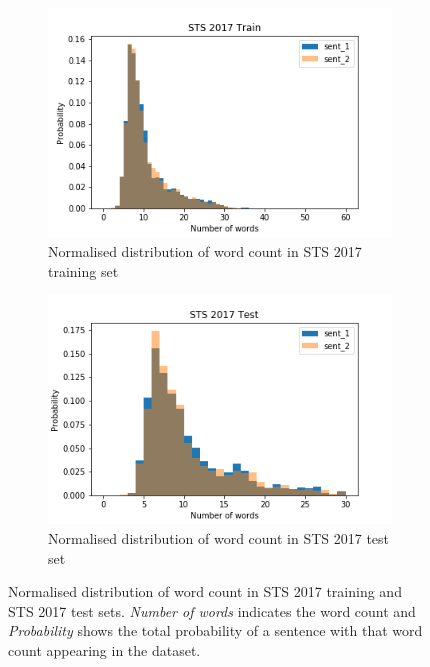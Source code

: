 \begin{enumerate}
\begin{figure}
	\captionsetup[subfigure]{justification=centering}
	\centering
	\begin{subfigure}[b]{.5\textwidth}
		\centering
		\includegraphics[width=\textwidth]{figures/semantic_textual_similarity/introduction/sts_2017_train_words.png}
		\caption{Normalised distribution of word count in STS 2017 training set}
		\label{fig:sts_train_words}
	\end{subfigure}%
	\begin{subfigure}[b]{.5\textwidth}
		\centering
		\includegraphics[width=\textwidth]{figures/semantic_textual_similarity/introduction/sts_2017_test_words.png}
		\caption{Normalised distribution of word count in STS 2017 test set}
		\label{fig:sts_test_words}
	\end{subfigure}
	\caption[Normalised distribution of word count in STS 2017 training and STS 2017 test sets.]{Normalised distribution of word count in STS 2017 training and STS 2017 test sets. \textit{Number of words} indicates the word count and \textit{Probability} shows the total probability of a sentence with that word count appearing in the dataset.}
	\label{fig:sts_words}
\end{figure}




\end{enumerate}
